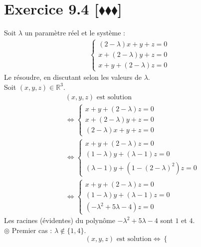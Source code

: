 \documentclass[10pt]{article}
\begin{document}
\section*{Exercice 9.4 [$\blacklozenge\blacklozenge\blacklozenge$]}
\begin{tcolorbox}[enhanced, width=7in, center, size=fbox, fontupper=\large, drop shadow southwest]
    Soit $\lambda$ un paramètre réel et le système :
    \begin{align*}
        \begin{cases}
            (2-\lambda)x + y + z = 0\\
            x + (2-\lambda)y + z = 0\\
            x + y + (2-\lambda)z = 0
        \end{cases}
    \end{align*}
    Le résoudre, en discutant selon les valeurs de $\lambda$.\\
    Soit $(x,y,z)\in\mathbb{R}^3$.
    \begin{align*}
        &(x,y,z) \text{ est solution}\\
        &\iff \begin{cases}
            x + y + (2-\lambda)z = 0\\
            x + (2-\lambda)y + z = 0\\
            (2 - \lambda)x + y + z = 0
        \end{cases}\\
        &\iff \begin{cases}
            x+y+(2-\lambda)z =0\\
            (1-\lambda)y + (\lambda-1)z=0\\
            (\lambda-1)y + (1-(2-\lambda)^2)z=0
        \end{cases}\\
        &\iff \begin{cases}
            x + y + (2-\lambda)z = 0\\
            (1-\lambda)y + (\lambda-1)z = 0\\
            (-\lambda^2 + 5\lambda - 4)z = 0
        \end{cases}
    \end{align*}
    Les racines (évidentes) du polynôme $-\lambda^2+5\lambda-4$ sont $1$ et $4$.\\
    $\circledcirc$ Premier cas : $\lambda\notin\{1,4\}$.
    \begin{equation*}
        (x,y,z) \text{ est solution}
        \iff\begin{cases}

\end{cases}
\end{equation*}
\end{tcolorbox}
\end{document}
